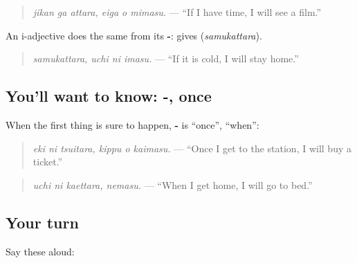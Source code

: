 \begin{quote}
\textbf{  }
\end{quote}

\begin{quote}
\emph{jikan ga attara, eiga o mimasu.} — \textquotedblleft{}If I have time, I will see a film.\textquotedblright{}
\end{quote}

An i-adjective does the same from its \textbf{-}: \textbf{} gives \textbf{} (\emph{samukattara}).

\begin{quote}
\textbf{ }
\end{quote}

\begin{quote}
\emph{samukattara, uchi ni imasu.} — \textquotedblleft{}If it is cold, I will stay home.\textquotedblright{}
\end{quote}

\subsection*{You'll want to know: -, once}
When the first thing is sure to happen, \textbf{-} is \textquotedblleft{}once\textquotedblright{}, \textquotedblleft{}when\textquotedblright{}:

\begin{quote}
\textbf{  }
\end{quote}

\begin{quote}
\emph{eki ni tsuitara, kippu o kaimasu.} — \textquotedblleft{}Once I get to the station, I will buy a ticket.\textquotedblright{}
\end{quote}

\begin{quote}
\textbf{ }
\end{quote}

\begin{quote}
\emph{uchi ni kaettara, nemasu.} — \textquotedblleft{}When I get home, I will go to bed.\textquotedblright{}
\end{quote}

\subsection*{Your turn}
Say these aloud:

